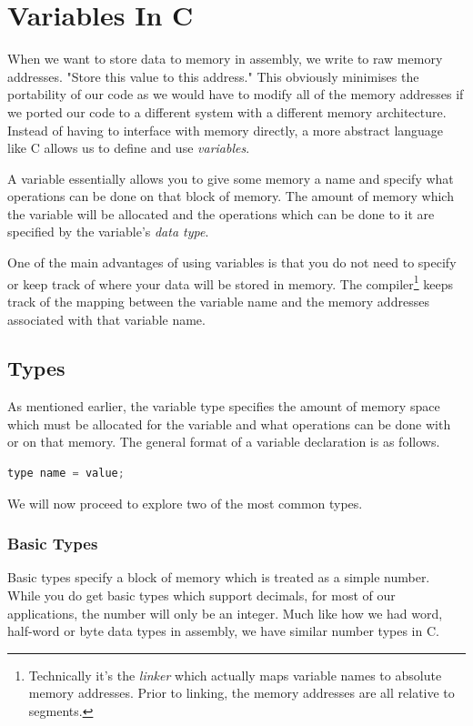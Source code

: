 \chapter{Variables In C}
When we want to store data to memory in assembly, we write to raw memory addresses. 
"Store this value to this address."
This obviously minimises the portability of our code as we would have to modify all of the memory addresses if we ported our code to a different system with a different memory architecture.
Instead of having to interface with memory directly, a more abstract language like C allows us to define and use \emph{variables}. 

A variable essentially allows you to give some memory a name and specify what operations can be done on that block of memory.
The amount of memory which the variable will be allocated and the operations which can be done to it are specified by the variable's \emph{data type}. 

One of the main advantages of using variables is that you do not need to specify or keep track of where your data will be stored in memory. The compiler\footnote{Technically it's the \emph{linker} which actually maps variable names to absolute memory addresses. Prior to linking, the memory addresses are all relative to segments.} keeps track of the mapping between the variable name and the memory addresses associated with that variable name.

\section{Types}
As mentioned earlier, the variable type specifies the amount of memory space which must be allocated for the variable and what operations can be done with or on that memory. The general format of a variable declaration is as follows.

\begin{lstlisting}[language=C]
type name = value;
\end{lstlisting}

We will now proceed to explore two of the most common types.

\subsection{Basic Types}
Basic types specify a block of memory which is treated as a simple number. While you do get basic types which support decimals, for most of our applications, the number will only be an integer. Much like how we had word, half-word or byte data types in assembly, we have similar number types in C.

